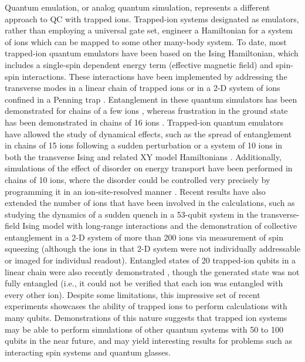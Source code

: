 \documentclass[%
12pt,
 amsmath,amssymb,
]{revtex4-2}
\begin{document}
Quantum emulation, or analog quantum simulation, represents a different approach to QC with trapped ions. Trapped-ion systems designated as emulators, rather than employing a universal gate set, engineer a  Hamiltonian for a system of ions which can be mapped to some other many-body system. To date, most trapped-ion quantum emulators have been based on the Ising Hamiltonian, which includes a single-spin dependent energy term (effective magnetic field) and spin-spin interactions. These interactions have been implemented by addressing the transverse modes in a linear chain of trapped ions \cite{KimTransverse2009} or in a 2-D system of ions confined in a Penning trap \cite{Britton2012}. Entanglement in these quantum simulators has been demonstrated for chains of a few ions \cite{KimFrustration2010}, whereas frustration in the ground state has been demonstrated in chains of 16 ions \cite{IslamIsingMagnetism2013}. Trapped-ion quantum emulators have allowed the study of dynamical effects, such as the spread of entanglement in chains of 15 ions following a sudden perturbation \cite{JurcevicQuasiparticle2014} or a system of 10 ions in both the transverse Ising and related XY model Hamiltonians \cite{JurcevicQuasiparticle2014,RichermeNonlocal2014}.  Additionally, simulations of the effect of disorder on energy transport have been performed in chains of 10 ions, where the disorder could be controlled very precisely by programming it in an ion-site-resolved manner \cite{SmithQTransport2016, MaierQTRansport2019}.  Recent results have also extended the number of ions that have been involved in the calculations, such as studying the dynamics of a sudden quench in a 53-qubit system in the transverse-field Ising model with long-range interactions \cite{Zhang53IonSim2017} and the demonstration of collective entanglement in a 2-D system of more than 200 ions via measurement of spin squeezing \cite{BohnetSpinDynamics2016} (although the ions in that 2-D system were not individually addressable or imaged for individual readout). Entangled states of 20 trapped-ion qubits in a linear chain were also recently demonstrated \cite{Friis20QubitEntanglement2018}, though the generated state was not fully entangled (i.e., it could not be verified that each ion was entangled with every other ion). Despite some limitations, this impressive set of recent experiments showcases the ability of trapped ions to perform calculations with many qubits. Demonstrations of this nature suggests that trapped ion systems may be able to perform simulations of other quantum systems with 50 to 100 qubits in the near future, and may yield interesting results for problems such as interacting spin systems and quantum glasses.
\end{document}
